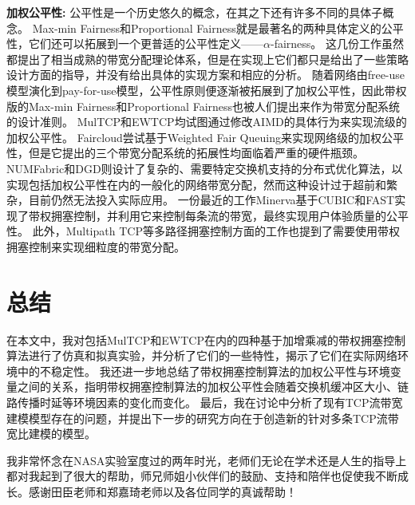\documentclass[winfonts]{njuthesis}
\begin{document}
{\bf 加权公平性: }
公平性是一个历史悠久的概念，在其之下还有许多不同的具体子概念。
Max-min Fairness\cite{bertsekas1992data,jaffe1981bottleneck}和Proportional Fairness\cite{kelly1998rate}就是最著名的两种具体定义的公平性，它们还可以拓展到一个更普适的公平性定义——$\alpha$-fairness\cite{mo2000fair}。
这几份工作虽然都提出了相当成熟的带宽分配理论体系，但是在实现上它们都只是给出了一些策略设计方面的指导，并没有给出具体的实现方案和相应的分析。
随着网络由free-use模型演化到pay-for-use模型，公平性原则便逐渐被拓展到了加权公平性，因此带权版的Max-min Fairness\cite{popa2012faircloud}和Proportional Fairness\cite{crowcroft1998differentiated}也被人们提出来作为带宽分配系统的设计准则。
MulTCP\cite{crowcroft1998differentiated}和EWTCP\cite{Honda2009EWTCP}均试图通过修改AIMD的具体行为来实现流级的加权公平性。
Faircloud\cite{popa2012faircloud}尝试基于Weighted Fair Queuing\cite{demers1989analysis,Abhay1993WFQ}来实现网络级的加权公平性，但是它提出的三个带宽分配系统的拓展性均面临着严重的硬件瓶颈。
NUMFabric\cite{nagaraj2016numfabric}和DGD\cite{low1999DGD}则设计了复杂的、需要特定交换机支持的分布式优化算法，以实现包括加权公平性在内的一般化的网络带宽分配，然而这种设计过于超前和繁杂，目前仍然无法投入实际应用。
一份最近的工作Minerva\cite{Nathan2019wcubic}基于CUBIC\cite{ha2008cubic}和FAST\cite{chen2004fast}实现了带权拥塞控制，并利用它来控制每条流的带宽，最终实现用户体验质量的公平性。
此外，Multipath TCP\cite{wischik2011design,lu2018multi}等多路径拥塞控制方面的工作也提到了需要使用带权拥塞控制来实现细粒度的带宽分配。

\chapter{总结}\label{chapter:conclusion}

在本文中，我对包括MulTCP和EWTCP在内的四种基于加增乘减的带权拥塞控制算法进行了仿真和拟真实验，并分析了它们的一些特性，揭示了它们在实际网络环境中的不稳定性。
我还进一步地总结了带权拥塞控制算法的加权公平性与环境变量之间的关系，指明带权拥塞控制算法的加权公平性会随着交换机缓冲区大小、链路传播时延等环境因素的变化而变化。
最后，我在讨论中分析了现有TCP流带宽建模模型存在的问题，并提出下一步的研究方向在于创造新的针对多条TCP流带宽比建模的模型。



\begin{acknowledgement}
我非常怀念在NASA实验室度过的两年时光，老师们无论在学术还是人生的指导上都对我起到了很大的帮助，师兄师姐小伙伴们的鼓励、支持和陪伴也促使我不断成长。感谢田臣老师和郑嘉琦老师以及各位同学的真诚帮助！
\end{acknowledgement}

\end{document}
